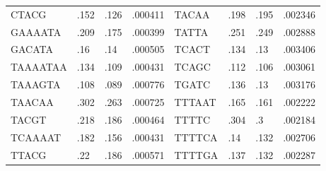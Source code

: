 \documentclass{article}
\begin{document}
\begin{table}[h]
\begin{tabular}{llll|llll}
    CTACG&.152&.126&.000411&TACAA&.198&.195&.002346\\
    GAAAATA&.209&.175&.000399&TATTA&.251&.249&.002888\\
    GACATA&.16&.14&.000505&TCACT&.134&.13&.003406\\
    TAAAATAA&.134&.109&.000431&TCAGC&.112&.106&.003061\\
    TAAAGTA&.108&.089&.000776&TGATC&.136&.13&.003176\\
    TAACAA&.302&.263&.000725&TTTAAT&.165&.161&.002222\\
    TACGT&.218&.186&.000464&TTTTC&.304&.3&.002184\\
    TCAAAAT&.182&.156&.000431&TTTTCA&.14&.132&.002706\\
    TTACG&.22&.186&.000571&TTTTGA&.137&.132&.002287\\
    \bottomrule
  \end{tabular}
  \label{tab:most_important_pattern}
\end{table}
\end{document}
